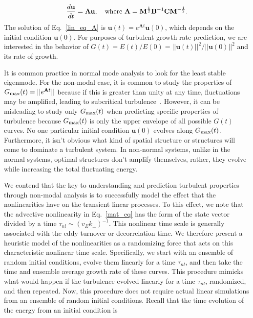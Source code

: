 \documentclass[letter,scriptaddress,twocolumn, prl,showkeys]{revtex4}
\def\beq{\begin{equation}}
\def\eeq{\end{equation}}
\newcommand{\diff}[2]{\frac{d#1}{d#2}}
\begin{document}
\beq
\label{lin_eq_A}
\diff{\mathbf{u}}{t} = \mathbf{A} \mathbf{u},  \quad \rm{where} \ \mathbf{A} = \mathbf{M}^{\frac{1}{2}} \mathbf{B}^{-1} \mathbf{C} \mathbf{M}^{-\frac{1}{2}}.
\eeq
The solution of Eq.~\ref{lin_eq_A} is $\mathbf{u}(t) = e^{\mathbf{A} t} \mathbf{u}(0)$, which
depends on the initial condition $\mathbf{u}(0)$. For purposes of turbulent growth rate prediction, we are interested in
the behavior of $G(t) = E(t)/E(0) = ||\mathbf{u}(t)||^2/||\mathbf{u}(0)||^2$ and its rate of growth.


It is common practice in normal mode analysis to look for the least stable eigenmode. 
For the non-modal case, it is common to study the properties of $G_{\rm{max}}(t) = ||e^{\mathbf{A} t}||$ because if this is greater than unity at any time, fluctuations may be amplified, 
leading to subcritical turbulence~\cite{trefethen2005,schmid2007}.
However, it can be misleading to study only $G_{\rm{max}}(t)$ when predicting specific properties of turbulence because
$G_{\rm{max}}(t)$ is only the upper envelope of all possible $G(t)$ curves. No one particular initial condition $\mathbf{u}(0)$ evolves along $G_{\rm{max}}(t)$. 
Furthermore, it isn't obvious what kind of spatial structure or structures will come to dominate a turbulent system.
In non-normal systems, unlike in the normal systems, optimal structures don't amplify themselves, rather, they evolve while increasing the total fluctuating energy.

We contend that the key to understanding and prediction turbulent properties through non-modal analysis is to successfully model the effect that the nonlinearities have on the transient linear processes. 
To this effect, we note that the advective nonlinearity in Eq.~\ref{mat_eq} has the form of the state vector divided by a time $\tau_{nl} \sim (v_E k_\perp)^{-1}$. This nonlinear
time scale is generally associated with the eddy turnover or decorrelation time. We therefore present a heuristic model of the nonlinearities 
as a randomizing force that acts on this characteristic nonlinear time scale.
Specifically, we start with an ensemble of random initial conditions, evolve them linearly for a time $\tau_{nl}$, and then take the time and ensemble average growth rate of these curves.
This procedure mimicks what would happen if the turbulence evolved linearly for a time $\tau_{nl}$, randomized, and then repeated. Now, this procedure does not require actual linear
simulations from an ensemble of random initial conditions. Recall that the time evolution of the energy from an initial condition is
\end{document}
